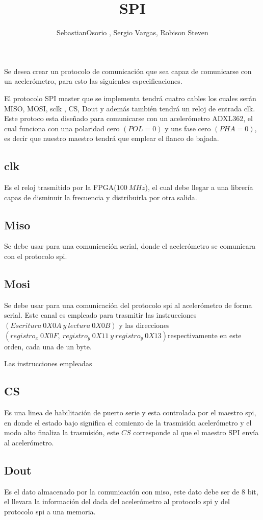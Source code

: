 \documentclass{article}
\title{SPI}
\author{SebastianOsorio , Sergio Vargas, Robison Steven} \\
\begin{document}
\maketitle 



Se desea crear un protocolo de comunicación que sea capaz de comunicarse con un acelerómetro, para esto las siguientes especificaciones.

El protocolo SPI master que se implementa tendrá cuatro cables los cuales serán MISO, MOSI, sclk , CS, Dout y además también tendrá un reloj de entrada clk. Este protoco esta diseñado para comunicarse con un acelerómetro ADXL362, el cual funciona con una polaridad cero $(POL=0)$ y uns fase cero $(PHA=0)$, es decir que nuestro maestro tendrá que emplear el flanco de bajada. 



\subsection{clk} Es el reloj trasmitido por la FPGA($100\ MHz$), el cual debe llegar a una librería capas de disminuir la frecuencia y distribuirla por otra salida.
\subsection{Miso} Se debe usar para una comunicación serial, donde el acelerómetro se comunicara con el protocolo spi.
\subsection{Mosi} Se debe usar para una comunicación del protocolo spi al acelerómetro de forma serial. Este canal es empleado para trasmitir las instrucciones $(Escritura\ 0X0A\ y\ lectura\ 0X0B)$  y las direcciones $(registro_x\ 0X0F,\ registro_y\ 0X11\ y \ registro_y\ 0X13)$respectivamente en este orden, cada una de un byte.

Las instrucciones empleadas 
\subsection{CS} Es una linea de habilitación de puerto serie y esta controlada por el maestro spi, en donde el estado bajo significa el comienzo de la trasmisión  acelerómetro y el modo alto finaliza la  trasmisión, este $CS$ corresponde al que el maestro SPI envía al acelerómetro.

\subsection{Dout} Es el dato almacenado por la comunicación con miso, este dato debe ser de 8 bit, el llevara la información del dada del acelerómetro al protocolo spi y del protocolo spi a una memoria. 
\end{document}

